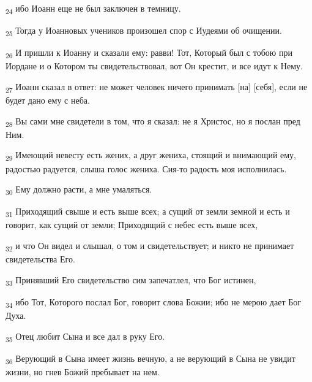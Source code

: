 \begin{tcolorbox}
\textsubscript{24} ибо Иоанн еще не был заключен в темницу.
\end{tcolorbox}
\begin{tcolorbox}
\textsubscript{25} Тогда у Иоанновых учеников произошел спор с Иудеями об очищении.
\end{tcolorbox}
\begin{tcolorbox}
\textsubscript{26} И пришли к Иоанну и сказали ему: равви! Тот, Который был с тобою при Иордане и о Котором ты свидетельствовал, вот Он крестит, и все идут к Нему.
\end{tcolorbox}
\begin{tcolorbox}
\textsubscript{27} Иоанн сказал в ответ: не может человек ничего принимать [на] [себя], если не будет дано ему с неба.
\end{tcolorbox}
\begin{tcolorbox}
\textsubscript{28} Вы сами мне свидетели в том, что я сказал: не я Христос, но я послан пред Ним.
\end{tcolorbox}
\begin{tcolorbox}
\textsubscript{29} Имеющий невесту есть жених, а друг жениха, стоящий и внимающий ему, радостью радуется, слыша голос жениха. Сия-то радость моя исполнилась.
\end{tcolorbox}
\begin{tcolorbox}
\textsubscript{30} Ему должно расти, а мне умаляться.
\end{tcolorbox}
\begin{tcolorbox}
\textsubscript{31} Приходящий свыше и есть выше всех; а сущий от земли земной и есть и говорит, как сущий от земли; Приходящий с небес есть выше всех,
\end{tcolorbox}
\begin{tcolorbox}
\textsubscript{32} и что Он видел и слышал, о том и свидетельствует; и никто не принимает свидетельства Его.
\end{tcolorbox}
\begin{tcolorbox}
\textsubscript{33} Принявший Его свидетельство сим запечатлел, что Бог истинен,
\end{tcolorbox}
\begin{tcolorbox}
\textsubscript{34} ибо Тот, Которого послал Бог, говорит слова Божии; ибо не мерою дает Бог Духа.
\end{tcolorbox}
\begin{tcolorbox}
\textsubscript{35} Отец любит Сына и все дал в руку Его.
\end{tcolorbox}
\begin{tcolorbox}
\textsubscript{36} Верующий в Сына имеет жизнь вечную, а не верующий в Сына не увидит жизни, но гнев Божий пребывает на нем.
\end{tcolorbox}
